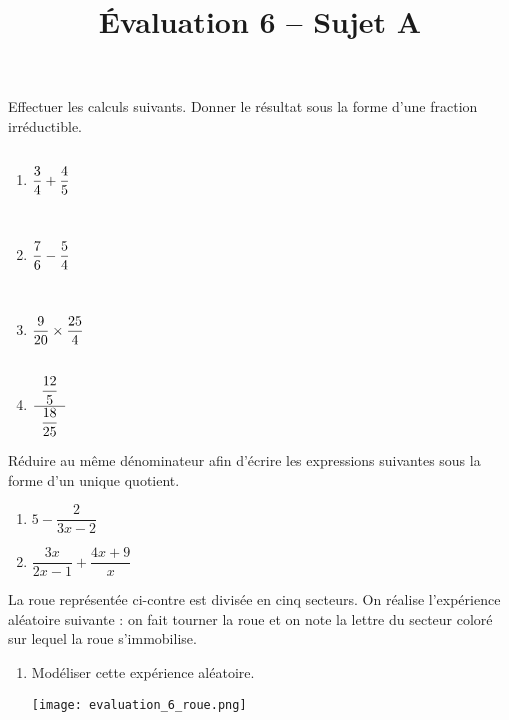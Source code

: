 \documentclass[a4paper,dvipsnames]{article}
\begin{document}
\title{Évaluation 6 -- Sujet A}
\author{}
\date{}

\maketitle{}

\pagestyle{empty}
\thispagestyle{empty}

\exo[3 points] Effectuer les calculs suivants. Donner le résultat sous la forme d'une fraction irréductible.
\begin{multicols}{4}
  \begin{enumerate}
    \item $\dfrac{3}{4} + \dfrac{4}{5}\vphantom{\dfrac{\dfrac{1}{2}}{\dfrac{3}{4}}}$\columnbreak
    \item $\dfrac{7}{6} - \dfrac{5}{4}\vphantom{\dfrac{\dfrac{1}{2}}{\dfrac{3}{4}}}$\columnbreak
    \item $\dfrac{9}{20} \times \dfrac{25}{4}\vphantom{\dfrac{\dfrac{1}{2}}{\dfrac{3}{4}}}$\columnbreak
    \item $\cfrac{\phantom{1}\dfrac{12}{5}\phantom{1}}{\dfrac{18}{25}}$
  \end{enumerate}
\end{multicols}
\dotfill{}

\bigskip

\exo[3 points] Réduire au même dénominateur afin d'écrire les expressions suivantes sous la forme d'un unique quotient.
\begin{multicols}{2}
  \begin{enumerate}
    \item $5-\dfrac{2}{3x-2}$
    \item $\dfrac{3x}{2x-1}+\dfrac{4x+9}{x}$
  \end{enumerate}
\end{multicols}
\dotfill{}

\pagebreak

\exo[3 points]\vspace*{-6mm}

\begin{multicols}{2}
  La roue représentée ci-contre est divisée en cinq secteurs. On réalise l'expérience aléatoire suivante : on fait tourner la roue et on note la lettre du secteur coloré sur lequel la roue s'immobilise.

  \begin{enumerate}
    \item Modéliser cette expérience aléatoire.
      \begin{center}
	\vspace*{1mm}\hspace*{7mm}\texttt{[image: evaluation\_6\_roue.png]}
      \end{center}
  \end{enumerate}
\end{multicols}
\end{document}
